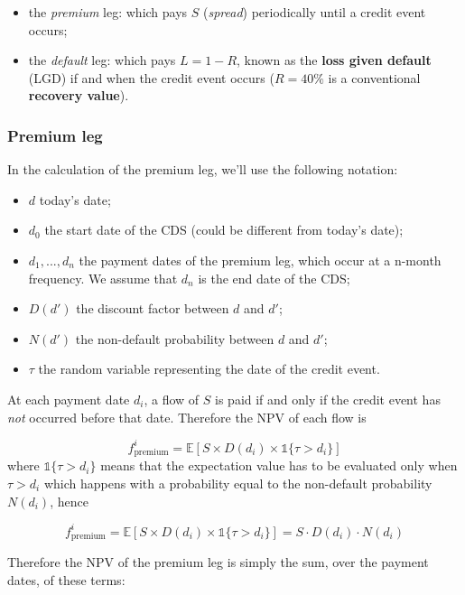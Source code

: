\begin{itemize}
\tightlist
\item
  the \emph{premium} leg: which pays \(S\) (\emph{spread}) periodically until a credit event occurs;
\item
  the \emph{default} leg: which pays \(L = 1 - R\), known as the
  \textbf{loss given default} (LGD) if and when the credit event occurs 
  (\(R = 40\%\) is a conventional \textbf{recovery value}).
\end{itemize}

\subsubsection{Premium leg}\label{premium-leg}

In the calculation of the premium leg, we'll use the following notation:

\begin{itemize}
\tightlist
\item
  \(d\) today's date;
\item
  \(d_0\) the start date of the CDS (could be different from today's date);
\item
  \(d_1, ..., d_n\) the payment dates of the premium leg, which occur at
  a n-month frequency. We assume that \(d_n\) is the end date of the CDS;
\item
  \(D(d')\) the discount factor between \(d\) and \(d'\);
\item
  \(N(d')\) the non-default probability between \(d\) and \(d'\);
\item
  \(\tau\) the random variable representing the date of the credit event.
\end{itemize}

At each payment date \(d_i\), a flow of \(S\) is paid if and only if the
credit event has \emph{not} occurred before that date. Therefore the NPV of
each flow is

\[
f_{\mathrm{premium}}^i = \mathbb{E}\left[ S \times D(d_i) \times \mathbb{1}\{\tau > d_i\} \right]
\]
where $\mathbb{1}\{\tau > d_i\}$ means that the expectation value has to be evaluated only when $\tau > d_i$ which happens with a probability equal to the non-default probability $N(d_i)$, hence 

\[
f_{\mathrm{premium}}^i = \mathbb{E}\left[ S \times D(d_i) \times \mathbb{1}\{\tau > d_i\} \right] = S \cdot D(d_i) \cdot N(d_i)
\]
 
Therefore the NPV of the premium leg is simply the sum, over the payment
dates, of these terms:

